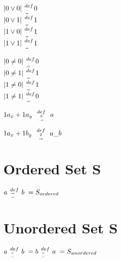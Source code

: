 \documentclass[11pt]{article}
\newcommand{\relationdef}[1]{ \hspace{2mm} { def \atop {#1 \atop \rightarrow }  } \hspace{2mm}}
\newcommand{\pairdef}[1]{ { \hspace{1mm} def \atop {#1 \atop -} \hspace{1mm} } }
\def \attrdef{ {\hspace{1mm} def \atop {. \atop = } \hspace{1mm}} }
\begin{document}
\begin{center}
$
|0 \lor 0| \attrdef 0
$
\\ \vspace{4mm}
$
|0 \lor 1| \attrdef 1
$
\\ \vspace{4mm}
$
|1 \lor 0| \attrdef 1
$
\\ \vspace{4mm}
$
|1 \lor 1| \attrdef 1
$
\end{center}








\begin{center}
$
|0 \neq 0| \attrdef 0
$
\\ \vspace{4mm}
$
|0 \neq 1| \attrdef 1
$
\\ \vspace{4mm}
$
|1 \neq 0| \attrdef 1
$
\\ \vspace{4mm}
$
|1 \neq 1| \attrdef 0
$
\end{center}



\begin{center}
$
1a_x + 1a_y \relationdef 2a
$
\end{center}
\begin{center}
$
1a_x + 1b_y \relationdef 2 a\_b
$
\end{center}







\section{Ordered Set S}

\begin{center}
$
a \pairdef{\rightarrow} \hspace{1mm} b \hspace{1mm}  = S_{ordered}
$
\end{center}







\section{Unordered Set S}

\begin{center}
$
a \pairdef{\circ} \hspace{1mm} b \hspace{1mm} =  b \pairdef{\circ} \hspace{1mm} a \hspace{1mm} = S_{unordered}
$
\end{center}
\end{document}
